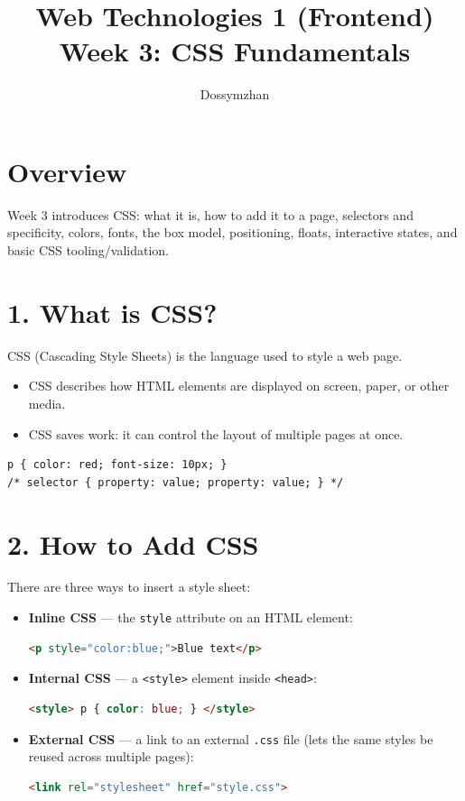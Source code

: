 \documentclass[12pt]{article}
\title{Web Technologies 1 (Frontend) \\ Week 3: CSS Fundamentals}
\author{Dossymzhan}
\date{}
\begin{document}
\maketitle

\section{Overview}
Week 3 introduces CSS: what it is, how to add it to a page, selectors and specificity, colors, fonts, the box model, positioning, floats, interactive states, and basic CSS tooling/validation.

\section{1. What is CSS?}
CSS (Cascading Style Sheets) is the language used to style a web page.
\begin{itemize}
    \item CSS describes how HTML elements are displayed on screen, paper, or other media.
    \item CSS saves work: it can control the layout of multiple pages at once.
\end{itemize}
\begin{lstlisting}
p { color: red; font-size: 10px; }
/* selector { property: value; property: value; } */
\end{lstlisting}

\section{2. How to Add CSS}
There are three ways to insert a style sheet:
\begin{itemize}
    \item \textbf{Inline CSS} — the \texttt{style} attribute on an HTML element:
    \begin{lstlisting}[language=HTML]
<p style="color:blue;">Blue text</p>
    \end{lstlisting}
    \item \textbf{Internal CSS} — a \texttt{<style>} element inside \texttt{<head>}:
    \begin{lstlisting}[language=HTML]
<style> p { color: blue; } </style>
    \end{lstlisting}
    \item \textbf{External CSS} — a link to an external \texttt{.css} file (lets the same styles be reused across multiple pages):
    \begin{lstlisting}[language=HTML]
<link rel="stylesheet" href="style.css">
    \end{lstlisting}
\end{itemize}
\end{document}
